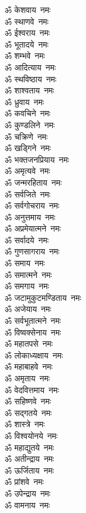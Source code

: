 \begin{multicols}{2}
\begin{flushleft}
ॐ केशवाय~नमः\\
ॐ स्थाणवे~नमः\\
ॐ ईश्वराय~नमः\\
ॐ भूतादये~नमः\\
ॐ शम्भवे~नमः\\
ॐ आदित्याय~नमः\\
ॐ स्थविष्ठाय~नमः\\
ॐ शाश्वताय~नमः\\
ॐ ध्रुवाय~नमः\hfill{}\\
ॐ कवचिने~नमः\\
ॐ कुण्डलिने~नमः\\
ॐ चक्रिणे~नमः\\
ॐ खड्गिने~नमः\\
ॐ भक्तजनप्रियाय~नमः\\
ॐ अमृत्यवे~नमः\\
ॐ जन्मरहिताय~नमः\\
ॐ सर्वजिते~नमः\\
ॐ सर्वगोचराय~नमः\\
ॐ अनुत्तमाय~नमः\hfill{}\\
ॐ अप्रमेयात्मने~नमः\\
ॐ सर्वादये~नमः\\
ॐ गुणसागराय~नमः\\
ॐ समाय~नमः\\
ॐ समात्मने~नमः\\
ॐ समगाय~नमः\\
ॐ जटामुकुटमण्डिताय~नमः\\
ॐ अजेयाय~नमः\\
ॐ सर्वभूतात्मने~नमः\\
ॐ विष्वक्सेनाय~नमः\hfill{}\\
ॐ महातपसे~नमः\\
ॐ लोकाध्यक्षाय~नमः\\
ॐ महाबाहवे~नमः\\
ॐ अमृताय~नमः\\
ॐ वेदवित्तमाय~नमः\\
ॐ सहिष्णवे~नमः\\
ॐ सद्गतये~नमः\\
ॐ शास्त्रे~नमः\\
ॐ विश्वयोनये~नमः\\
ॐ महाद्युतये~नमः\hfill{}\\
ॐ अतीन्द्राय~नमः\\
ॐ ऊर्जिताय~नमः\\
ॐ प्रांशवे~नमः\\
ॐ उपेन्द्राय~नमः\\
ॐ वामनाय~नमः\\

\end{flushleft}
\end{multicols}

